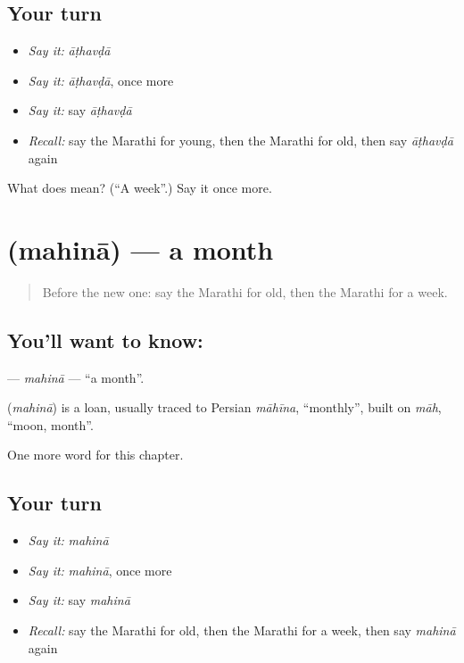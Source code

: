 \subsection*{Your turn}
\begin{itemize}
\raggedright
  \item \emph{Say it:} \emph{āṭhavḍā}
  \item \emph{Say it:} \emph{āṭhavḍā}, once more
  \item \emph{Say it:} say \emph{āṭhavḍā}
  \item \emph{Recall:} say the Marathi for young, then the Marathi for old, then say \emph{āṭhavḍā} again
\end{itemize}

\begin{tcolorbox}[breakable,colback=teal!4,colframe=teal!35!black,title={Before you move on}]
What does  mean? (\textquotedblleft{}A week\textquotedblright{}.) Say it once more.
\end{tcolorbox}
\section[\texorpdfstring{\mr{महिना} (mahinā)}{महिना (mahinā)}]{ (mahinā) — a month}

\label{lesson:MR-C109-mahina}



\begin{quote}
Before the new one: say the Marathi for old, then the Marathi for a week.
\end{quote}

\subsection*{You'll want to know: }
\textbf{} — \emph{mahinā} — \textquotedblleft{}a month\textquotedblright{}.

\begin{cousinweb}
\textbf{} (\emph{mahinā}) is a loan, usually traced to Persian \emph{māhīna}, \textquotedblleft{}monthly\textquotedblright{}, built on \emph{māh}, \textquotedblleft{}moon, month\textquotedblright{}.
\end{cousinweb}

\begin{grammarlens}[title={What you've built}]
One more word for this chapter.
\end{grammarlens}

\subsection*{Your turn}
\begin{itemize}
\raggedright
  \item \emph{Say it:} \emph{mahinā}
  \item \emph{Say it:} \emph{mahinā}, once more
  \item \emph{Say it:} say \emph{mahinā}
  \item \emph{Recall:} say the Marathi for old, then the Marathi for a week, then say \emph{mahinā} again
\end{itemize}

